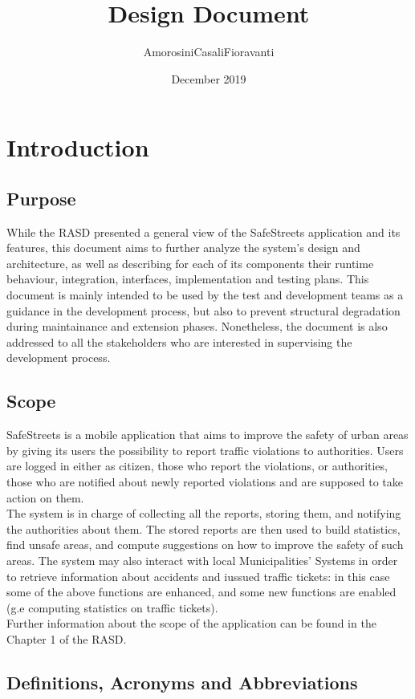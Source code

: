 \documentclass{report}
\title{Design Document}
\author{AmorosiniCasaliFioravanti}
\date{December 2019}
\begin{document}


\tableofcontents

\chapter{Introduction}
\section{Purpose}
While the RASD presented a general view of the SafeStreets application and its features, this document aims to further analyze the system's design and architecture, as well as describing for each of its components their runtime behaviour, integration, interfaces, implementation and testing plans.
This document is mainly intended to be used by the test and development teams as a guidance in the development process, but also to prevent structural degradation during maintainance and extension phases. Nonetheless, the document is also addressed to all the stakeholders who are interested in supervising the development process.

\section{Scope}
SafeStreets is a mobile application that aims to improve the safety of urban areas by giving its users the possibility to report traffic violations to authorities. Users are logged in either as citizen, those who report the violations, or authorities, those who are notified about newly reported violations and are supposed to take action on them.\\
The system is in charge of collecting all the reports, storing them, and notifying the authorities about them. The stored reports are then used to build statistics, find unsafe areas, and compute suggestions on how to improve the safety of such areas. The system may also interact with local Municipalities' Systems in order to retrieve information about accidents and iussued traffic tickets: in this case some of the above functions are enhanced, and some new functions are enabled (g.e computing statistics on traffic tickets).\\
\newline
Further information about the scope of the application can be found in the Chapter 1 of the RASD.

\section{Definitions, Acronyms and Abbreviations}
\end{document}
